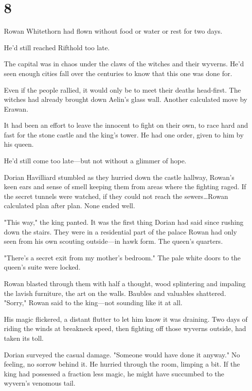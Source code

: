 
\chapter{8}

Rowan Whitethorn had flown without food or water or rest for two days.

He'd still reached Rifthold too late.

The capital was in chaos under the claws of the witches and their wyverns.
He'd seen enough cities fall over the centuries to know that this one was done for.

Even if the people rallied, it would only be to meet their deaths head-first.
The witches had already brought down Aelin's glass wall.
Another calculated move by Erawan.

It had been an effort to leave the innocent to fight on their own, to race hard and fast for the stone castle and the king's tower.
He had one order, given to him by his queen.

He'd still come too late---but not without a glimmer of hope.

Dorian Havilliard stumbled as they hurried down the castle hallway, Rowan's keen ears and sense of smell keeping them from areas where the fighting raged.
If the secret tunnels were watched, if they could not reach the sewers\ldots Rowan calculated plan after plan.
None ended well.

"This way," the king panted.
It was the first thing Dorian had said since rushing down the stairs.
They were in a residential part of the palace Rowan had only seen from his own scouting outside---in hawk form.
The queen's quarters.

"There's a secret exit from my mother's bedroom."
The pale white doors to the queen's suite were locked.

Rowan blasted through them with half a thought, wood splintering and impaling the lavish furniture, the art on the walls.
Baubles and valuables shattered.
"Sorry," Rowan said to the king---not sounding like it at all.

His magic flickered, a distant flutter to let him know it was draining.
Two days of riding the winds at breakneck speed, then fighting off those wyverns outside, had taken its toll.

Dorian surveyed the casual damage.
"Someone would have done it anyway."
No feeling, no sorrow behind it.
He hurried through the room, limping a bit.
If the king had possessed a fraction less magic, he might have succumbed to the wyvern's venomous tail.

